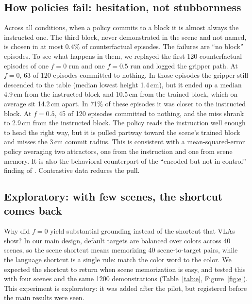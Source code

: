 \documentclass[11pt]{article}
\begin{document}
\subsection{How policies fail: hesitation, not stubbornness}
Across all conditions, when a policy commits to a block it is almost always the instructed one.
The third block, never demonstrated in the scene and not named, is chosen in at most 0.4\% of
counterfactual episodes. The failures are ``no block'' episodes. To see what happens in them, we
replayed the first 120 counterfactual episodes of one $f{=}0$ run and one $f{=}0.5$ run and
logged the gripper path. At $f{=}0$, 63 of 120 episodes committed to nothing. In those episodes
the gripper still descended to the table (median lowest height 1.4\,cm), but it ended up a
median 4.9\,cm from the instructed block and 10.5\,cm from the trained block, which on average
sit 14.2\,cm apart. In 71\% of these episodes it was closer to the instructed block. At $f{=}0.5$,
45 of 120 episodes committed to nothing, and the miss shrank to 2.9\,cm from the instructed block.
The policy reads the instruction well enough to head the right way, but it is pulled partway
toward the scene's trained block and misses the 3\,cm commit radius. This is consistent with a
mean-squared-error policy averaging two attractors, one from the instruction and one from
scene memory. It is also the behavioral counterpart of the ``encoded but not in control''
finding of \citet{jiang2026encoded}. Contrastive data reduces the pull.

\subsection{Exploratory: with few scenes, the shortcut comes back}\label{sec:fewscenes}
Why did $f{=}0$ yield substantial grounding instead of the shortcut that VLAs show? In our main
design, default targets are balanced over colors across 40 scenes, so the scene shortcut means
memorizing 40 scene-to-target pairs, while the language shortcut is a single rule: match the color
word to the color. We expected the shortcut to return when scene memorization is easy, and tested
this with four scenes and the same 1200 demonstrations (Table~\ref{tab:e}, Figure~\ref{fig:e}).
This experiment is exploratory: it was added after the pilot, but registered before the main
results were seen.
\end{document}
